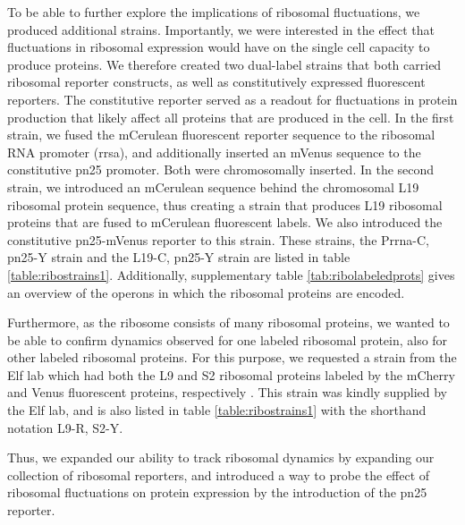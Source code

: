To be able to further explore the implications of ribosomal fluctuations, 
we produced additional strains.
%
Importantly, we were interested in the effect that fluctuations in ribosomal expression would have on 
the single cell capacity to produce proteins.
%
We therefore created two dual-label strains that both carried ribosomal reporter constructs, as well as constitutively expressed fluorescent reporters.
%
The constitutive reporter served as a readout for fluctuations in protein production that likely affect all proteins that are produced in the cell. 
%
In the first strain, we fused the mCerulean fluorescent reporter sequence to the ribosomal RNA promoter (rrsa), and additionally inserted an mVenus sequence to the constitutive pn25 promoter. Both were chromosomally inserted.
%
In the second strain, we introduced an mCerulean sequence behind the chromosomal L19 ribosomal protein sequence, thus creating a strain that produces L19 ribosomal proteins that are fused to mCerulean fluorescent labels.
We also introduced the constitutive pn25-mVenus reporter to this strain.
%
These strains, the Prrna-C, pn25-Y strain and the L19-C, pn25-Y strain are listed in table \ref{table:ribostrains1}.
Additionally, supplementary table \ref{tab:ribolabeledprots} gives an overview of the operons in which the ribosomal proteins are encoded.

Furthermore, as the ribosome consists of many ribosomal proteins, we wanted to be able to confirm 
dynamics observed for one labeled ribosomal protein, also for other labeled ribosomal proteins.
%
For this purpose, we requested a strain from the Elf lab which had both the L9 and S2 ribosomal proteins labeled by the mCherry and Venus fluorescent proteins, respectively \cite{Wallden2016}.
This strain was kindly supplied by the Elf lab, and is also listed in table \ref{table:ribostrains1} with the shorthand notation L9-R, S2-Y.

Thus, we expanded our ability to track ribosomal dynamics by 
expanding our collection of ribosomal reporters, 
and introduced a way to probe the effect of ribosomal fluctuations on protein expression by the introduction of the pn25 reporter.


